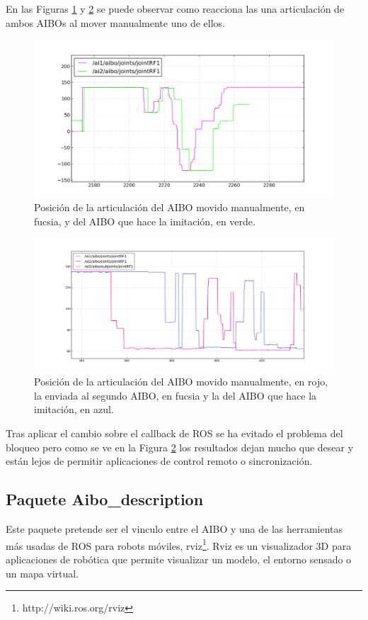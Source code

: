 \documentclass[12pt,a4paper,final,twoside]{book}
\begin{document}
En las Figuras \ref{fig:resumimic} y \ref{fig:resumimic2} se puede observar como reacciona las una articulación de ambos AIBOs al mover manualmente uno de ellos. 
\begin{figure}[H]
	\centering
    \includegraphics[scale=0.655]{images/mimic/retmin2.png}
	 \caption{Posición de la articulación del AIBO movido manualmente, en fucsia, y del AIBO que hace la imitación, en verde.}
  \label{fig:resumimic}
\end{figure}
\begin{figure}[H]
	\centering
    \includegraphics[scale=0.41]{images/mimic/malo5hz.png}
	 \caption{Posición de la articulación del AIBO movido manualmente, en rojo, la enviada al segundo AIBO, en fucsia y la del AIBO que hace la imitación, en azul.}
  \label{fig:resumimic2}
\end{figure}


Tras aplicar el cambio sobre el callback de ROS se ha evitado el problema del bloqueo pero como se ve en la Figura \ref{fig:resumimic2} los resultados dejan mucho que desear y están lejos de permitir aplicaciones de control remoto o sincronización. 

\subsection{Paquete Aibo{\_}description }
Este paquete pretende ser el vinculo entre el AIBO y una de las herramientas más usadas de ROS para robots móviles, rviz\footnote{http://wiki.ros.org/rviz}. Rviz es un visualizador 3D para aplicaciones de robótica que permite visualizar un modelo, el entorno sensado o un mapa virtual. 
\end{document}

